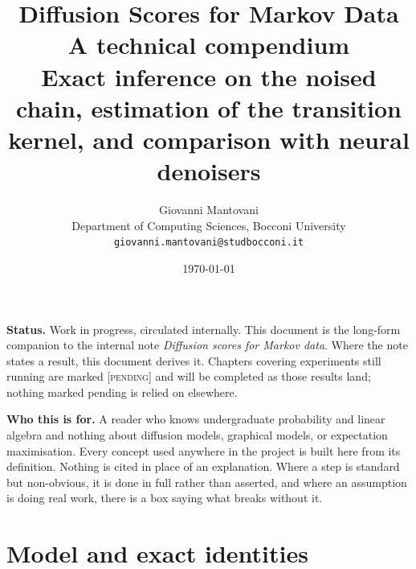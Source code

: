 \documentclass[11pt,a4paper]{report}
\title{\vspace{-2cm}\textbf{Diffusion Scores for Markov Data}\\[0.4em]
\Large A technical compendium\\[1.2em]
\large\normalfont Exact inference on the noised chain, estimation of the transition
kernel, and comparison with neural denoisers}
\author{Giovanni Mantovani\\
\small Department of Computing Sciences, Bocconi University\\
\small \texttt{giovanni.mantovani@studbocconi.it}}
\date{\today}
\theoremstyle{plain}
\theoremstyle{definition}
\theoremstyle{remark}
\begin{document}
\maketitle

\begin{center}
\begin{tcolorbox}[width=0.9\textwidth, colback=black!3, colframe=black!30]
\textbf{Status.} Work in progress, circulated internally. This document is the long-form
companion to the internal note \emph{Diffusion scores for Markov data}. Where the note states
a result, this document derives it. Chapters covering experiments still running are marked
\textsc{[pending]} and will be completed as those results land; nothing marked pending is
relied on elsewhere.
\end{tcolorbox}
\end{center}

\vspace{1em}

\begin{center}
\begin{minipage}{0.86\textwidth}
\small
\textbf{Who this is for.} A reader who knows undergraduate probability and linear algebra and
nothing about diffusion models, graphical models, or expectation maximisation. Every concept
used anywhere in the project is built here from its definition. Nothing is cited in place of
an explanation. Where a step is standard but non-obvious, it is done in full rather than
asserted, and where an assumption is doing real work, there is a box saying what breaks
without it.
\end{minipage}
\end{center}

\setcounter{tocdepth}{1}
\tableofcontents

%

\part{Model and exact identities}



\end{document}
